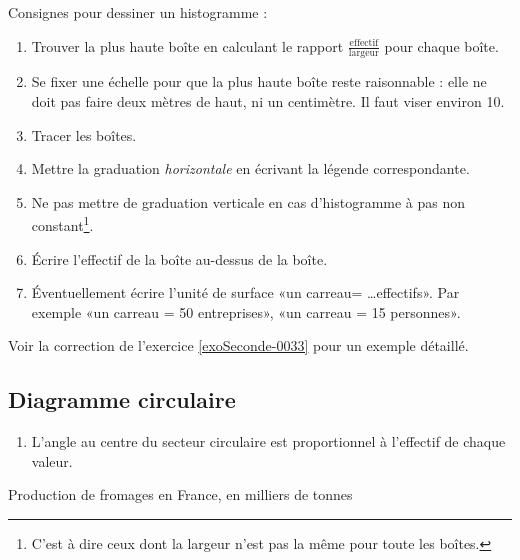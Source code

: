 Consignes pour dessiner un histogramme :
\begin{enumerate}
    \item
        Trouver la plus haute boîte en calculant le rapport \( \frac{ \text{effectif} }{ \text{largeur} }\) pour chaque boîte.
    \item
        Se fixer une échelle pour que la plus haute boîte reste raisonnable : elle ne doit pas faire deux mètres de haut, ni un centimètre. Il faut viser environ \unit{10}{\centi\meter}.
    \item
        Tracer les boîtes.
    \item
        Mettre la graduation \emph{horizontale} en écrivant la légende correspondante.
    \item
        Ne pas mettre de graduation verticale en cas d'histogramme à pas non constant\footnote{C'est à dire ceux dont la largeur n'est pas la même pour toute les boîtes.}.
    \item
        Écrire l'effectif de la boîte au-dessus de la boîte.
    \item
        Éventuellement écrire l'unité de surface «un carreau= \ldots effectifs». Par exemple «un carreau = 50 entreprises», «un carreau = 15 personnes».
\end{enumerate}
Voir la correction de l'exercice \ref{exoSeconde-0033} pour un exemple détaillé.

\subsection{Diagramme circulaire}

\begin{multicols}{2}
  \begin{enumerate}
  \item L'angle au centre du secteur circulaire est proportionnel à l'effectif
    de chaque valeur.
  \end{enumerate}
  
  \columnbreak
  
  \begin{example}
 Production de fromages en France, en milliers de tonnes
  \begin{minipage}{1.0\linewidth}
    \vspace{-2em}
    \begin{center}
    \end{center}    
  \end{minipage}
  \end{example}
\end{multicols}



